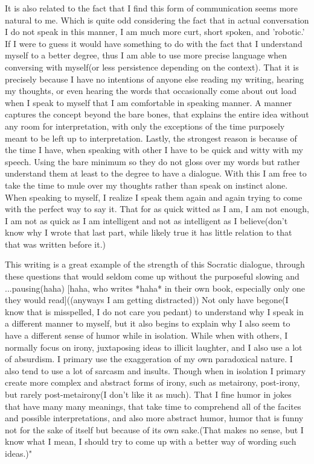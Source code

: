 \par It is also related to the fact that I find this form of communication seems more natural to me. Which is quite odd considering the fact that in actual conversation I do not speak in this manner, I am much more curt, short spoken, and 'robotic.' If I were to guess it would have something to do with the fact that I understand myself to a better degree, thus I am able to use more precise language when conversing with myself(or less persistence depending on the context). That it is precisely because I have no intentions of anyone else reading my writing, hearing my thoughts, or even hearing the words that occasionally come about out load when I speak to myself that I am comfortable in speaking manner. A manner captures the concept beyond the bare bones, that explains the entire idea without any room for interpretation, with only the exceptions of the time purposely meant to be left up to interpretation. Lastly, the strongest reason is because of the time I have, when speaking with other I have to be quick and witty with my speech. Using the bare minimum so they do not gloss over my words but rather understand them at least to the degree to have a dialogue. With this I am free to take the time to mule over my thoughts rather than speak on instinct alone. When speaking to myself, I realize I speak them again and again trying to come with the perfect way to say it. That for as quick witted as I am, I am not enough, I am not as quick as I am intelligent and not as intelligent as I believe(don't know why I wrote that last part, while likely true it has little relation to that that was written before it.)

\par This writing is a great example of the strength of this Socratic dialogue, through these questions that would seldom come up without the purposeful slowing and ...pausing(haha) [haha, who writes *haha* in their own book, especially only one they would read]((anyways I am getting distracted)) Not only have begone(I know that is misspelled, I do not care you pedant) to understand why I speak in a different manner to myself, but it also begins to explain why I also seem to have a different sense of humor while in isolation. While when with others, I normally focus on irony, juxtaposing ideas to illicit laughter, and I also use a lot of absurdism. I primary use the exaggeration of my own paradoxical nature. I also tend to use a lot of sarcasm and insults. Though when in isolation I primary create more complex and abstract forms of irony, such as metairony, post-irony, but rarely post-metairony(I don't like it as much). That I fine humor in jokes that have many many meanings, that take time to comprehend all of the facites and possible interpretations, and also more abstract humor, humor that is funny not for the sake of itself but because of its own sake.(That makes no sense, but I know what I mean, I should try to come up with a better way of wording such ideas.)"

